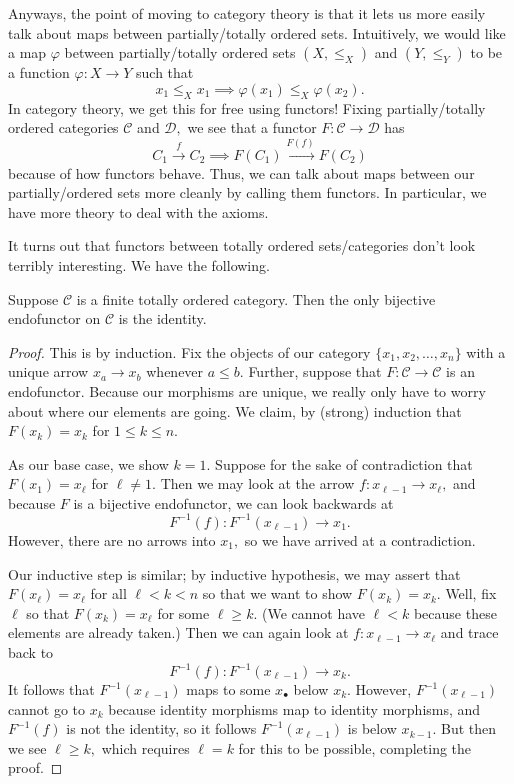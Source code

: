 Anyways, the point of moving to category theory is that it lets us more easily talk about maps between partially/totally ordered sets. Intuitively, we would like a map $\varphi$ between partially/totally ordered sets $(X,\le_X)$ and $(Y,\le_Y)$ to be a function $\varphi:X\to Y$ such that
\[x_1\le_Xx_1\implies\varphi(x_1)\le_X\varphi(x_2).\]
In category theory, we get this for free using functors! Fixing partially/totally ordered categories $\mathcal C$ and $\mathcal D,$ we see that a functor $F:\mathcal C\to\mathcal D$ has
\[C_1\stackrel f\to C_2\implies F(C_1)\stackrel{F(f)}\to F(C_2)\]
because of how functors behave. Thus, we can talk about maps between our partially/ordered sets more cleanly by calling them functors. In particular, we have more theory to deal with the axioms.

It turns out that functors between totally ordered sets/categories don't look terribly interesting. We have the following.
\begin{proposition}
    Suppose $\mathcal C$ is a finite totally ordered category. Then the only bijective endofunctor on $\mathcal C$ is the identity.
\end{proposition}

\begin{proof}
    This is by induction. Fix the objects of our category $\{x_1,x_2,\ldots,x_n\}$ with a unique arrow $x_a\to x_b$ whenever $a\le b.$ Further, suppose that $F:\mathcal C\to\mathcal C$ is an endofunctor. Because our morphisms are unique, we really only have to worry about where our elements are going. We claim, by (strong) induction that $F(x_k)=x_k$ for $1\le k\le n.$
    
    As our base case, we show $k=1.$ Suppose for the sake of contradiction that $F(x_1)=x_\ell$ for $\ell\ne1.$ Then we may look at the arrow $f:x_{\ell-1}\to x_\ell,$ and because $F$ is a bijective endofunctor, we can look backwards at 
    \[F^{-1}(f):F^{-1}(x_{\ell-1})\to x_1.\]
    However, there are no arrows into $x_1,$ so we have arrived at a contradiction.
    
    Our inductive step is similar; by inductive hypothesis, we may assert that $F(x_\ell)=x_\ell$ for all $\ell<k<n$ so that we want to show $F(x_k)=x_k.$ Well, fix $\ell$ so that $F(x_k)=x_\ell$ for some $\ell\ge k.$ (We cannot have $\ell<k$ because these elements are already taken.) Then we can again look at $f:x_{\ell-1}\to x_\ell$ and trace back to
    \[F^{-1}(f):F^{-1}(x_{\ell-1})\to x_k.\]
    It follows that $F^{-1}(x_{\ell-1})$ maps to some $x_\bullet$ below $x_k.$ However, $F^{-1}(x_{\ell-1})$ cannot go to $x_k$ because identity morphisms map to identity morphisms, and $F^{-1}(f)$ is not the identity, so it follows $F^{-1}(x_{\ell-1})$ is below $x_{k-1}.$ But then we see $\ell\ge k,$ which requires $\ell=k$ for this to be possible, completing the proof.
\end{proof}

